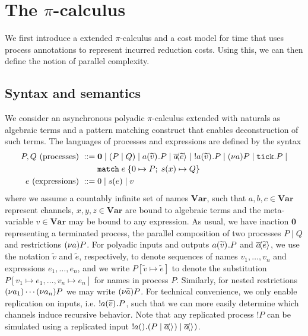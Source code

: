 \section{The $\pi$-calculus}\label{ch:picalc}

We first introduce a extended $\pi$-calculus and a cost model for time that uses process annotations to represent incurred reduction costs. Using this, we can then define the notion of parallel complexity.


\subsection{Syntax and semantics}
We consider an asynchronous polyadic $\pi$-calculus extended with naturals as algebraic terms and a pattern matching construct that enables deconstruction of such terms. The languages of processes and expressions are defined by the syntax 
%
\begin{align*}
    P,Q \text{ (processes) } ::=&\; \mathbf{0} \mid \left(P \mid Q \right) \mid a(\widetilde{v})^{}.P \mid \overline{a}\!\langle \widetilde{e}\rangle^{} \mid\; ! a(\widetilde{v})^{}.P \mid (\nu a) P \mid \texttt{tick}.P \mid \\
    &\; \texttt{match}\; e\; \{ 0 \mapsto P;\; s(x) \mapsto Q \}\\
    e \text{ (expressions) } ::=&\; 0 \mid s(e) \mid v
\end{align*}
%
where we assume a countably infinite set of names $\textbf{Var}$, such that $a,b,c\in\textbf{Var}$ represent channels, $x,y,z\in\textbf{Var}$ are bound to algebraic terms and the meta-variable $v\in\textbf{Var}$ may be bound to any expression. As usual, we have inaction $\mathbf{0}$ representing a terminated process, the parallel composition of two processes $P \mid Q$ and restrictions $(\nu a) P$. 
For polyadic inputs and outputs $a(\widetilde{v})^{}.P$ and $\overline{a}\!\langle \widetilde{e}\rangle^{}$, we use the notation $\widetilde{v}$ and $\widetilde{e}$, respectively, to denote sequences of names $v_1,\dots,v_n$ and expressions $e_1,\dots,e_n$, and we write $P[\widetilde{v}\mapsto\widetilde{e}]$ to denote the substitution $P[v_1\mapsto e_1,\dots,v_n\mapsto e_n]$ for names in process $P$. Similarly, for nested restrictions $(\nu a_1) \cdots (\nu a_n) P$ we may write $(\nu \widetilde{a}) P$. For technical convenience, we only enable replication on inputs, i.e. $!a(\widetilde{v})^{}.P$, such that we can more easily determine which channels induce recursive behavior. Note that any replicated process $!P$ can be simulated using a replicated input $!a()^{}.(P \mid \overline{a}\!\langle \rangle^{}) \mid \overline{a}\!\langle \rangle^{})$.\\ 

